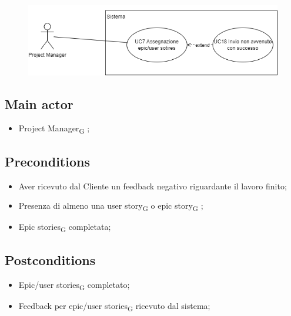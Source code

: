 \documentclass{article}
\begin{document}
\begin{figure}[h]
      \centering
      \includegraphics{./imgUML/UC7.png}
      \label{fig:immagine}
    \end{figure}
    
    \subsection*{Main actor}
    \begin{itemize}
        \item Project Manager\textsubscript{G} ;
    \end{itemize}
    
    \subsection*{Preconditions}
    \begin{itemize}
        \item Aver ricevuto dal Cliente un feedback negativo riguardante il lavoro finito;
        \item Presenza di almeno una user story\textsubscript{G}  o epic story\textsubscript{G} ;
        \item Epic stories\textsubscript{G}  completata;
    \end{itemize}
    
    \subsection*{Postconditions}
    \begin{itemize}
        \item Epic/user stories\textsubscript{G}  completato;
        \item Feedback per epic/user stories\textsubscript{G}  ricevuto dal sistema; 
    \end{itemize}
    
\end{document}
